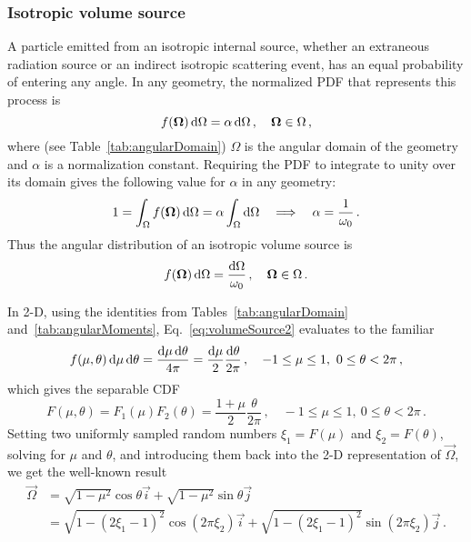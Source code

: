 \subsubsection{Isotropic volume source}
A particle emitted from an isotropic internal source, whether an extraneous
radiation source or an indirect isotropic scattering event, has an equal
probability of entering any angle. In any geometry, the normalized PDF that
represents this process is
\begin{equation}\label{eq:volumeSource1}
  f(\bm{\Omega}) \mathop{}\!\mathrm{d} \Omega = \alpha \mathop{}\!\mathrm{d} \Omega \,,
  \quad \bm{\Omega} \in \Omega \,,
\end{equation}
where (see Table~\ref{tab:angularDomain}) $\Omega$ is the angular domain of the
geometry and $\alpha$ is a normalization constant.
Requiring the PDF to integrate to unity over its domain gives the
following value for $\alpha$ in any geometry:
\begin{align*}
  1 = \int_{\Omega} f(\bm{\Omega}) \mathop{}\!\mathrm{d}\Omega
  = \alpha \int_{\Omega} \mathop{}\!\mathrm{d}\Omega
  \quad \Longrightarrow \quad
  \alpha = \frac{1}{\omega_0}\,.
\end{align*}
Thus the angular distribution of an isotropic volume source is
\begin{equation}\label{eq:volumeSource2}
  f(\bm{\Omega}) \mathop{}\!\mathrm{d} \Omega = \frac{\mathop{}\!\mathrm{d}\Omega}{\omega_0} \,,
  \quad \bm{\Omega} \in \Omega\,.
\end{equation}

In 2-D, using the identities from Tables~\ref{tab:angularDomain}
and~\ref{tab:angularMoments}, Eq.~\eqref{eq:volumeSource2} evaluates to the
familiar
\begin{equation*}
  f(\mu,\theta) \mathop{}\!\mathrm{d}\mu\mathop{}\!\mathrm{d}\theta = \frac{\mathop{}\!\mathrm{d}\mu\mathop{}\!\mathrm{d}\theta}{4\pi} 
  = \frac{\mathop{}\!\mathrm{d}\mu}{2}\frac{\mathop{}\!\mathrm{d}\theta}{2\pi}
  \,,
  \quad -1\le \mu \le 1,\ 0 \le \theta < 2\pi\,,
\end{equation*}
which gives the separable CDF
\begin{equation*}
  F(\mu,\theta) = F_1(\mu) F_2(\theta)
  = \frac{1 + \mu}{2}\frac{\theta}{2\pi}\,,
  \quad -1\le \mu \le 1,\ 0 \le \theta < 2\pi\,.
\end{equation*}
Setting two uniformly sampled random numbers $\xi_1 = F(\mu)$ and
$\xi_2 = F(\theta)$, solving for $\mu$ and $\theta$, and
introducing them back into the 2-D representation of $\vec{\Omega}$, we get the
well-known result
\begin{align*}
  \vec{\Omega} &= \sqrt{1-\mu^2} \cos \theta \vec{i}
  + \sqrt{1-\mu^2} \sin \theta \vec{j}
\\
  &= \sqrt{1-(2\xi_1-1)^2} \cos(2\pi\xi_2) \vec{i}
  + \sqrt{1-(2\xi_1-1)^2} \sin(2\pi\xi_2) \vec{j}\,.
\end{align*}


